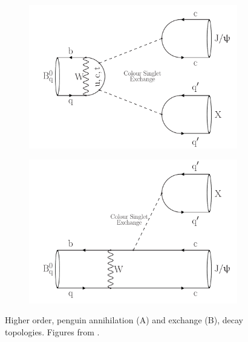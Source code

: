 \begin{figure}[t]
  \centering
  \begin{subfigure}{0.5\textwidth}
    \raggedright
    \includegraphics[width=1.02\textwidth, trim=1.3cm 0cm 0.5cm 0.5cm, clip=true]{Figures/Chapter5/B2JpsiX_PenguinAnnihilation}
    \caption{}
    \label{peng_exchange}
  \end{subfigure}%
  \hfill%
  \begin{subfigure}{0.5\textwidth}
    \raggedleft
    \includegraphics[width=1.02\textwidth,trim=1cm 0cm 0.5cm 0.5cm, clip=true]{Figures/Chapter5/B2JpsiX_Exchange}
    \caption{}
    \label{peng_anihilation}
  \end{subfigure}
  \caption{Higher order, penguin annihilation (A) and exchange (B), \BJpsiX decay topologies. Figures from \cite{DeBruyn-thesis}.}
  \label{peng_ana_exchange}
\end{figure}
